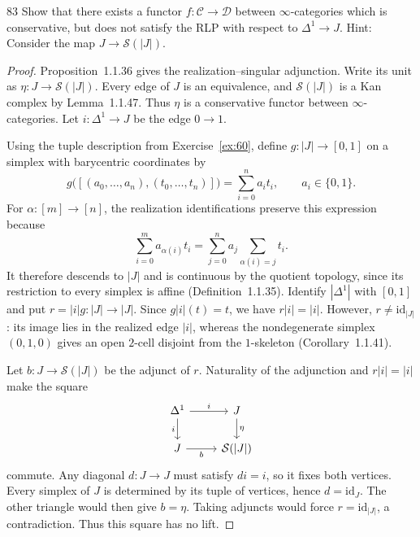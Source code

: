 \begin{exercise}{83}
Show that there exists a functor $f\colon\mathcal C\to\mathcal D$ between $\infty$-categories
which is conservative, but does not satisfy the RLP with respect to $\Delta^1\to J$.
Hint: Consider the map $J\to\mathcal S(|J|)$.

\begin{proof}
Proposition~1.1.36 gives the realization--singular adjunction.
Write its unit as $\eta\colon J\to\mathcal S(|J|)$.
Every edge of $J$ is an equivalence, and $\mathcal S(|J|)$
is a Kan complex by Lemma~1.1.47.
Thus $\eta$ is a conservative functor between $\infty$-categories.
Let $i\colon\Delta^1\to J$ be the edge $0\to1$.

Using the tuple description from Exercise~\ref{ex:60}, define
$g\colon|J|\to[0,1]$ on a simplex with barycentric coordinates by
\[
 g\bigl([(a_0,\ldots,a_n),(t_0,\ldots,t_n)]\bigr)
 =\sum_{i=0}^n a_it_i,
 \qquad a_i\in\{0,1\}.
\]
For $\alpha\colon[m]\to[n]$, the realization identifications
preserve this expression because
\[
 \sum_{i=0}^m a_{\alpha(i)}t_i
 =\sum_{j=0}^n a_j\sum_{\alpha(i)=j}t_i.
\]
It therefore descends to $|J|$ and is continuous by the
quotient topology, since its restriction to every simplex
is affine (Definition~1.1.35).
Identify $|\Delta^1|$ with $[0,1]$ and put
$r=|i|g\colon|J|\to|J|$.
Since $g|i|(t)=t$, we have $r|i|=|i|$.
However, $r\neq\mathrm{id}_{|J|}$:
its image lies in the realized edge $|i|$, whereas the
nondegenerate simplex $(0,1,0)$ gives an open $2$-cell
disjoint from the $1$-skeleton (Corollary~1.1.41).

Let $b\colon J\to\mathcal S(|J|)$ be the adjunct of $r$.
Naturality of the adjunction and $r|i|=|i|$ make the square
\[
\begin{tikzcd}
 \Delta^1 \arrow[r,"i"] \arrow[d,"i"']
   & J \arrow[d,"\eta"] \\
 J \arrow[r,"b"'] & \mathcal S(|J|)
\end{tikzcd}
\]
commute.
Any diagonal $d\colon J\to J$ must satisfy $di=i$,
so it fixes both vertices.
Every simplex of $J$ is determined by its tuple of vertices,
hence $d=\mathrm{id}_J$.
The other triangle would then give $b=\eta$.
Taking adjuncts would force $r=\mathrm{id}_{|J|}$,
a contradiction.
Thus this square has no lift.
\end{proof}
\end{exercise}
